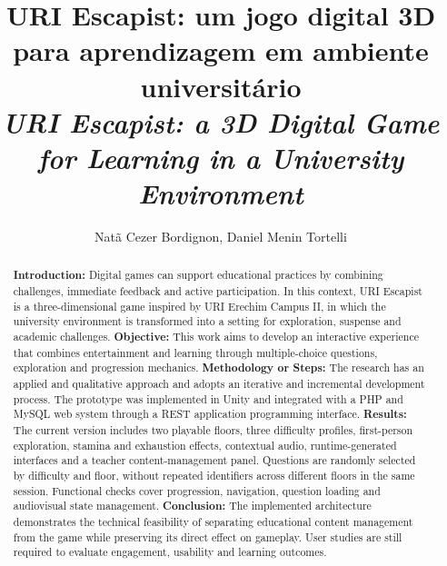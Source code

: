 \documentclass[12pt]{article}
\title{URI Escapist: um jogo digital 3D para aprendizagem em ambiente universitário \\
\medskip
\small{
    \textit{URI Escapist: a 3D Digital Game for Learning in a University Environment}
}
}
\author{Natã Cezer Bordignon\inst{1}, Daniel Menin Tortelli\inst{1}}
\begin{document}
\maketitle

\thispagestyle{plain}
\pagestyle{plain2}

\begin{abstract}
\textbf{Introduction:} Digital games can support educational practices by combining challenges, immediate feedback and active participation. In this context, URI Escapist is a three-dimensional game inspired by URI Erechim Campus II, in which the university environment is transformed into a setting for exploration, suspense and academic challenges.
\textbf{Objective:} This work aims to develop an interactive experience that combines entertainment and learning through multiple-choice questions, exploration and progression mechanics.
\textbf{Methodology or Steps:} The research has an applied and qualitative approach and adopts an iterative and incremental development process. The prototype was implemented in Unity and integrated with a PHP and MySQL web system through a REST application programming interface.
\textbf{Results:} The current version includes two playable floors, three difficulty profiles, first-person exploration, stamina and exhaustion effects, contextual audio, runtime-generated interfaces and a teacher content-management panel. Questions are randomly selected by difficulty and floor, without repeated identifiers across different floors in the same session. Functional checks cover progression, navigation, question loading and audiovisual state management.
\textbf{Conclusion:} The implemented architecture demonstrates the technical feasibility of separating educational content management from the game while preserving its direct effect on gameplay. User studies are still required to evaluate engagement, usability and learning outcomes.
\end{abstract}

\end{document}
